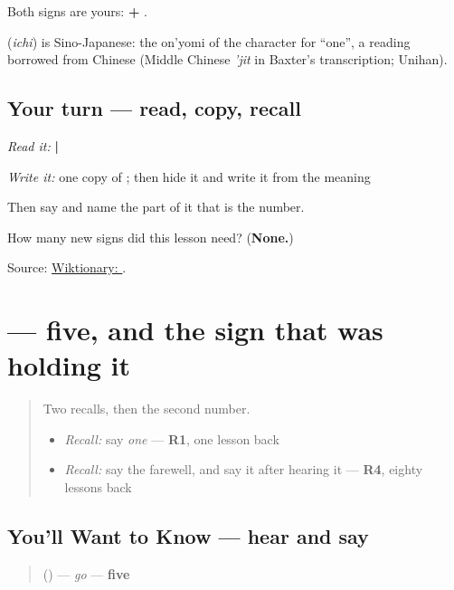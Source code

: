 Both signs are yours: \textbf{ + }.

\begin{cousinweb}
\textbf{} (\emph{ichi}) is Sino-Japanese: the on'yomi of the character for \textquotedblleft{}one\textquotedblright{}, a reading borrowed from Chinese (Middle Chinese \emph{'jit} in Baxter's transcription; Unihan).
\end{cousinweb}

\subsection*{Your turn — read, copy, recall}
\emph{Read it:} \textbf{ | }

\emph{Write it:} one copy of \textbf{}; then hide it and write it from the meaning

Then say \textbf{} and name the part of it that is the number.

\begin{tcolorbox}[breakable,colback=teal!4,colframe=teal!35!black,title={Before you move on}]
How many new signs did this lesson need? (\textbf{None.})

Source: \href{https://en.wiktionary.org/wiki/\%E3\%81\%84\%E3\%81\%A1}{Wiktionary: }.
\end{tcolorbox}
\section[\texorpdfstring{\ja{五} (go)}{五 (go)}]{ — five, and the sign that was holding it}

\label{lesson:JA-C14-go}



\begin{quote}
Two recalls, then the second number.

\begin{itemize}
\raggedright
  \item \emph{Recall:} say \emph{one} — \textbf{R1}, one lesson back
  \item \emph{Recall:} say the farewell, and say it after hearing it — \textbf{R4}, eighty lessons back
\end{itemize}
\end{quote}

\subsection*{You'll Want to Know — hear and say}
\begin{quote}
\textbf{} () — \emph{go} — \textbf{five}
\end{quote}

